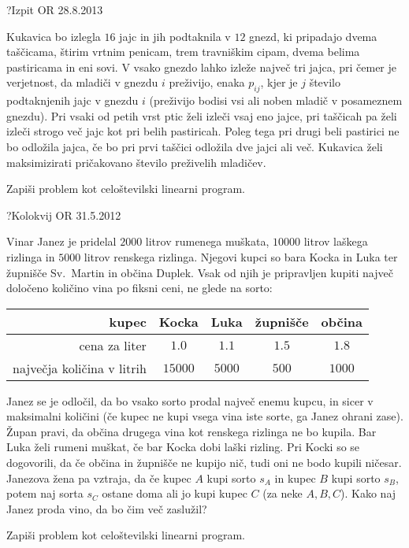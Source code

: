 \begin{naloga}{}{?}{Izpit OR 28.8.2013}
\begin{vprasanje}
Kukavica bo izlegla $16$ jajc in jih podtaknila v $12$ gnezd,
ki pripadajo dvema taščicama, štirim vrtnim penicam, trem travniškim cipam,
dvema belima pastiricama in eni sovi.
V vsako gnezdo lahko izleže največ tri jajca,
pri čemer je verjetnost, da mladiči v gnezdu $i$ preživijo,
enaka $p_{ij}$, kjer je $j$ število podtaknjenih jajc v gnezdu $i$
(preživijo bodisi vsi ali noben mladič v posameznem gnezdu).
Pri vsaki od petih vrst ptic želi izleči vsaj eno jajce,
pri taščicah pa želi izleči strogo več jajc kot pri belih pastiricah.
Poleg tega pri drugi beli pastirici ne bo odložila jajca,
če bo pri prvi taščici odložila dve jajci ali več.
Kukavica želi maksimizirati pričakovano število preživelih mladičev.

Zapiši problem kot celoštevilski linearni program.
\end{vprasanje}
\begin{odgovor}
\end{odgovor}
\end{naloga}


\begin{naloga}{}{?}{Kolokvij OR 31.5.2012}
\begin{vprasanje}
Vinar Janez je pridelal $2000$ litrov rumenega muškata,
$10000$ litrov laškega rizlinga in $5000$ litrov renskega rizlinga.
Njegovi kupci so bara Kocka in Luka ter župnišče Sv.~Martin in občina Duplek.
Vsak od njih je pripravljen kupiti največ določeno količino vina
po fiksni ceni, ne glede na sorto:

\begin{center}
\begin{tabular}{r|cccc}
kupec & Kocka & Luka & župnišče & občina \\ \hline
cena za liter & $1.0$ & $1.1$ & $1.5$ & $1.8$ \\
največja količina v litrih & $15000$ & $5000$ & $500$ & $1000$ \\
\end{tabular}
\end{center}

Janez se je odločil, da bo vsako sorto prodal največ enemu kupcu,
in sicer v maksimalni količini
(če kupec ne kupi vsega vina iste sorte, ga Janez ohrani zase).
Župan pravi, da občina drugega vina kot renskega rizlinga ne bo kupila.
Bar Luka želi rumeni muškat, če bar Kocka dobi laški rizling.
Pri Kocki so se dogovorili, da če občina in župnišče ne kupijo nič,
tudi oni ne bodo kupili ničesar.
Janezova žena pa vztraja,
da če kupec $A$ kupi sorto $s_A$ in kupec $B$ kupi sorto $s_B$,
potem naj sorta $s_C$ ostane doma ali jo kupi kupec $C$ (za neke $A, B, C$).
Kako naj Janez proda vino, da bo čim več zaslužil?

Zapiši problem kot celoštevilski linearni program.
\end{vprasanje}
\begin{odgovor}
\end{odgovor}
\end{naloga}

